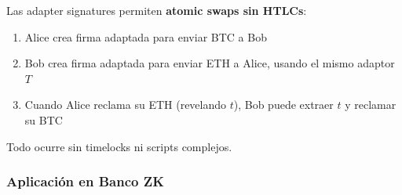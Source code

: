 \documentclass[11pt,a4paper,twoside,openright]{book}
\theoremstyle{definition}
\theoremstyle{plain}
\theoremstyle{remark}
\begin{document}
\begin{intuicion}
Las adapter signatures permiten \textbf{atomic swaps sin HTLCs}:
\begin{enumerate}
    \item Alice crea firma adaptada para enviar BTC a Bob
    \item Bob crea firma adaptada para enviar ETH a Alice, usando el mismo adaptor $T$
    \item Cuando Alice reclama su ETH (revelando $t$), Bob puede extraer $t$ y reclamar su BTC
\end{enumerate}

Todo ocurre sin timelocks ni scripts complejos.
\end{intuicion}

\subsubsection{Aplicación en Banco ZK}
\end{document}
